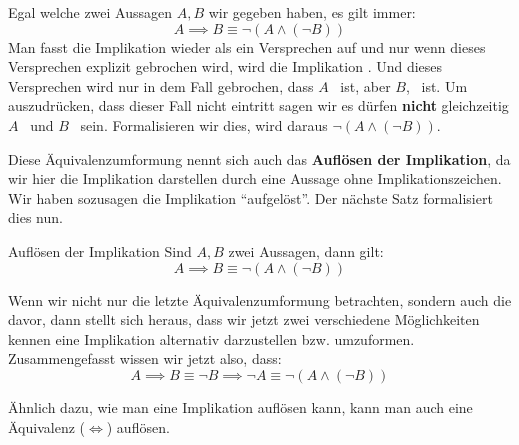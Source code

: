 \documentclass[../../main.tex]{subfiles}
\begin{document}
    Egal welche zwei Aussagen $A,B$ wir 
    gegeben haben, es gilt immer:
    \[A \implies B \equiv \lnot (A \land (\lnot B))\] 
    Man fasst die Implikation wieder als 
    ein Versprechen auf und nur wenn dieses Versprechen explizit gebrochen wird,
     wird die Implikation \falsch. Und dieses Versprechen wird nur in dem Fall 
     gebrochen, dass $A$ \wahr\ ist, aber $B$, \falsch\  ist. Um auszudrücken, 
     dass dieser Fall nicht eintritt sagen wir es dürfen \textbf{nicht} gleichzeitig 
     $A$ \wahr\ und $B$ \falsch\ sein. Formalisieren wir dies, wird daraus 
     $\lnot (A \land (\lnot B))$.
    
    Diese Äquivalenzumformung nennt sich auch das \textbf{Auflösen der Implikation}, da wir hier die Implikation darstellen durch eine Aussage ohne Implikationszeichen. Wir haben sozusagen die Implikation \enquote{aufgelöst}. Der nächste Satz formalisiert dies nun.
    
    \begin{theorem}{Auflösen der Implikation}
        Sind $A,B$ zwei Aussagen, dann gilt:
        \[A \implies B \equiv \lnot (A \land (\lnot B))\]
    \end{theorem}
    
    Wenn wir nicht nur die letzte Äquivalenzumformung betrachten, sondern auch die davor, 
    dann stellt sich heraus, 
    dass wir jetzt zwei verschiedene Möglichkeiten kennen eine Implikation alternativ 
    darzustellen bzw. umzuformen. Zusammengefasst wissen wir jetzt also, dass:
     \[A \implies B \equiv \lnot B \implies \lnot A \equiv \lnot (A \land (\lnot B))\]
    
    Ähnlich dazu, wie man eine Implikation auflösen kann, 
    kann man auch eine Äquivalenz ($\iff$) auflösen.
\end{document}
